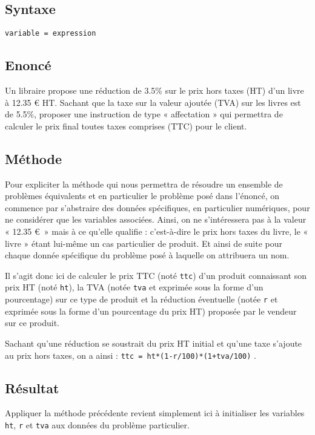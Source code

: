 \subsection{Syntaxe \python}\label{affectation:vie-courante:python}

\begin{description}
\item[\texttt{variable = expression}]\mbox{}
\end{description}

\subsection{Enoncé}\label{affectation:vie-courante:enonce}
Un libraire propose une réduction de 3.5\% sur le prix hors taxes (HT) 
d'un livre à 12.35 \euro{} HT.
Sachant que la taxe sur la valeur ajoutée (TVA) sur les livres est de 5.5\%, 
proposer une instruction de type « affectation » qui permettra de calculer 
le prix final toutes taxes comprises (TTC) pour le client.

\subsection{Méthode}\label{affectation:vie-courante:methode}
Pour expliciter la méthode qui nous permettra de résoudre un ensemble de problèmes 
équivalents et en particulier le problème posé dans l'énoncé, on commence par s'abstraire 
des données spécifiques, en particulier numériques, pour ne considérer que les variables associées. 
Ainsi, on ne s'intéressera pas à la valeur « 12.35 \euro~» mais à ce qu'elle qualifie : 
c'est-à-dire le prix hors taxes du livre, le « livre » étant lui-même un cas particulier de produit.
Et ainsi de suite pour chaque donnée spécifique du problème posé à laquelle on attribuera un nom.

Il s'agit donc ici de calculer le prix TTC (noté \texttt{ttc}) d'un produit
connaissant son prix HT (noté \texttt{ht}), la TVA (notée \texttt{tva} et
exprimée sous la forme d'un pourcentage) sur ce type de produit et 
la réduction éventuelle (notée \texttt{r} et exprimée sous la forme d'un 
pourcentage du prix HT) proposée par le vendeur sur ce produit.

Sachant qu'une réduction se soustrait du prix HT initial et 
qu'une taxe s'ajoute au prix hors taxes,
on a ainsi : \texttt{ttc = ht*(1-r/100)*(1+tva/100)} .

\subsection{Résultat}\label{affectation:vie-courante:resultat}
Appliquer la méthode précédente revient simplement ici à initialiser les variables
\texttt{ht}, \texttt{r} et \texttt{tva} aux données du problème particulier.

